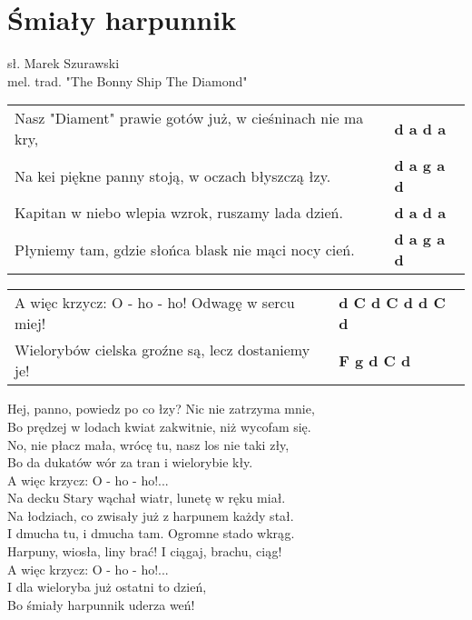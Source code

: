 \section{Śmiały harpunnik}

sł. Marek Szurawski\\
mel. trad. "The Bonny Ship The Diamond"\\

\vspace{2em}
\begin{tabular}{@{}p{10cm}@{}l@{}}
Nasz "Diament" prawie gotów już, w cieśninach nie ma kry, & \bfseries d a d a\\
Na kei piękne panny stoją, w oczach błyszczą łzy. & \bfseries d a g a d\\
Kapitan w niebo wlepia wzrok, ruszamy lada dzień. & \bfseries d a d a\\
Płyniemy tam, gdzie słońca blask nie mąci nocy cień. & \bfseries d a g a d\\
\end{tabular}

\begin{tabular}{@{}p{10cm}@{}l@{}}
A więc krzycz: O - ho - ho! Odwagę w sercu miej! & \bfseries d C d C d d C d\\
Wielorybów cielska groźne są, lecz dostaniemy je! & \bfseries F g d C d\\
\end{tabular}

\vspace{1em}
Hej, panno, powiedz po co łzy? Nic nie zatrzyma mnie, \\
Bo prędzej w lodach kwiat zakwitnie, niż wycofam się. \\
No, nie płacz mała, wrócę tu, nasz los nie taki zły, \\
Bo da dukatów wór za tran i wielorybie kły. \\

A więc krzycz: O - ho - ho!... \\

Na decku Stary wąchał wiatr, lunetę w ręku miał. \\
Na łodziach, co zwisały już z harpunem każdy stał. \\
I dmucha tu, i dmucha tam. Ogromne stado wkrąg. \\
Harpuny, wiosła, liny brać! I ciągaj, brachu, ciąg! \\

A więc krzycz: O - ho - ho!... \\

I dla wieloryba już ostatni to dzień, \\
Bo śmiały harpunnik uderza weń!  \\